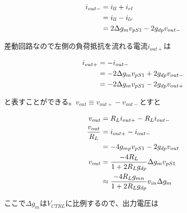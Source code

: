 \documentclass[twocolumn]{jsarticle}
\begin{document}
\begin{align}
    i_{out-}&=i_{ll}+i_{rl} \notag\\
    &=i_{ll}-i_{lr} \notag\\
    &=2\Delta g_{m}v_{pS1}-2g_{dp}v_{out-}
\end{align}

差動回路なので左側の負荷抵抗を流れる電流$i_{out+}$は

\begin{align}
    i_{out+}&=-i_{out-} \notag\\
    &=-2\Delta g_{m}v_{pS1}+2g_{dp}v_{out-} \notag\\
    &=-2\Delta g_{m}v_{pS1}-2g_{dp}v_{out+}
\end{align}

と表すことができる。$v_{out}\equiv v_{out+}-v_{out-}$とすと

\begin{align}
    v_{out}&=R_{L}i_{out+}-R_{L}i_{out-} \notag\\
    \frac{v_{out}}{R_L}&=i_{out+}-i_{out-} \notag\\
    &=-4g_{mp}v_{pS1}-2g_{dp}v_{out} \notag\\
    v_{out}&=\frac{-4R_{L}}{1+2R_{L}g_{dp}}\Delta g_{m}v_{pS1} \notag\\
    &\approx \frac{-4R_{L}g_{mn}}{1+2R_{L}g_{dp}}v_{in}\Delta g_{m}
\end{align}

ここで$\Delta g_{m}$は$V_{CTRL}$に比例するので、出力電圧は
\end{document}

